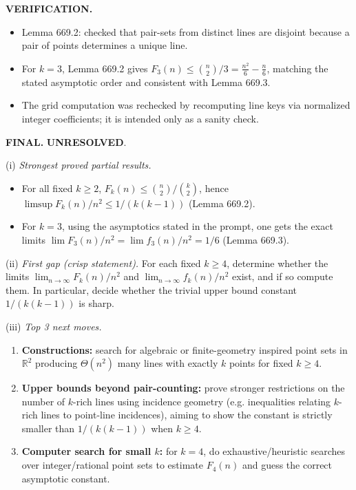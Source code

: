 \bigskip
\noindent\textbf{VERIFICATION.}
\begin{itemize}
\item Lemma 669.2: checked that pair-sets from distinct lines are disjoint because a pair of points determines a unique line.
\item For $k=3$, Lemma 669.2 gives $F_3(n)\le \binom n2/3 = \frac{n^2}{6}-\frac{n}{6}$, matching the stated asymptotic order and consistent with Lemma 669.3.
\item The grid computation was rechecked by recomputing line keys via normalized integer coefficients; it is intended only as a sanity check.
\end{itemize}

\bigskip
\noindent\textbf{FINAL.} \textbf{UNRESOLVED}.

\smallskip
\noindent(i) \emph{Strongest proved partial results.}
\begin{itemize}
\item For all fixed $k\ge 2$, $F_k(n)\le \binom n2/\binom k2$, hence $\limsup F_k(n)/n^2\le 1/(k(k-1))$ (Lemma 669.2).
\item For $k=3$, using the asymptotics stated in the prompt, one gets the exact limits $\lim F_3(n)/n^2=\lim f_3(n)/n^2=1/6$ (Lemma 669.3).
\end{itemize}

\noindent(ii) \emph{First gap (crisp statement).}
For each fixed $k\ge 4$, determine whether the limits
$\lim_{n\to\infty} F_k(n)/n^2$ and $\lim_{n\to\infty} f_k(n)/n^2$ exist, and if so compute them.
In particular, decide whether the trivial upper bound constant $1/(k(k-1))$ is sharp.

\noindent(iii) \emph{Top 3 next moves.}
\begin{enumerate}
\item \textbf{Constructions:} search for algebraic or finite-geometry inspired point sets in $\mathbb{R}^2$ producing $\Theta(n^2)$ many lines with exactly $k$ points for fixed $k\ge 4$.
\item \textbf{Upper bounds beyond pair-counting:} prove stronger restrictions on the number of $k$-rich lines using incidence geometry (e.g. inequalities relating $k$-rich lines to point-line incidences), aiming to show the constant is strictly smaller than $1/(k(k-1))$ when $k\ge 4$.
\item \textbf{Computer search for small $k$:} for $k=4$, do exhaustive/heuristic searches over integer/rational point sets to estimate $F_4(n)$ and guess the correct asymptotic constant.
\end{enumerate}

